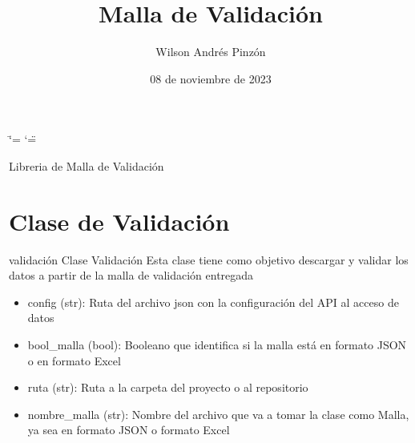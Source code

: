 \documentclass[letterpaper,10pt,spanish]{sphinxmanual}
\title{Malla de Validación}
\date{08 de noviembre de 2023}
\author{Wilson Andrés Pinzón}
\begin{document}
\ifdefined\shorthandoff
  \ifnum\catcode`\=\string=\active\shorthandoff{=}\fi
  \ifnum\catcode`\"=\active{}\fi
\fi

\pagestyle{empty}
\sphinxmaketitle
\pagestyle{plain}
\sphinxtableofcontents
\pagestyle{normal}
\label{\detokenize{index::doc}}


\sphinxAtStartPar
Libreria de Malla de Validación


\chapter{Clase de Validación}
\label{\detokenize{index:clase-de-validacion}}

\begin{fulllineitems}
\label{\detokenize{index:MallaValidacionRuta.validacion}}
\pysigstartsignatures
{}
\pysigstopsignatures
\sphinxAtStartPar
validación
Clase Validación
Esta clase tiene como objetivo descargar y validar los datos a partir de la malla de validación entregada
\begin{description}
\begin{itemize}
\item {} 
\sphinxAtStartPar
config (str): Ruta del archivo json con la configuración del API al acceso de datos

\item {} 
\sphinxAtStartPar
bool\_malla (bool): Booleano que identifica si la malla está en formato JSON o en formato Excel

\item {} 
\sphinxAtStartPar
ruta (str): Ruta a la carpeta del proyecto o al repositorio

\item {} 
\sphinxAtStartPar
nombre\_malla (str): Nombre del archivo que va a tomar la clase como Malla, ya sea en formato JSON o formato Excel


\end{itemize}
\end{description}
\end{fulllineitems}
\end{document}
